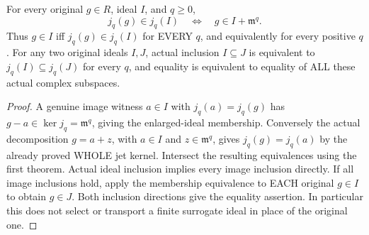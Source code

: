 \begin{theorem}
\label{hir:actual-whole-ideal-all-finite-jet-detection}
\leanok
For every original $g\in R$, ideal $I$, and $q\ge0$,
\[
 j_q(g)\in j_q(I)\quad\Longleftrightarrow\quad
 g\in I+\mathfrak m^q.
\]
Thus $g\in I$ iff $j_q(g)\in j_q(I)$ for EVERY $q$, and equivalently
for every positive $q$. For any two original ideals $I,J$, actual
inclusion $I\subseteq J$ is equivalent to $j_q(I)\subseteq j_q(J)$ for
every $q$, and equality is equivalent to equality of ALL these actual
complex subspaces.
\end{theorem}
\begin{proof}
A genuine image witness $a\in I$ with $j_q(a)=j_q(g)$ has
$g-a\in\ker j_q=\mathfrak m^q$, giving the enlarged-ideal membership.
Conversely the actual decomposition $g=a+z$, with $a\in I$ and
$z\in\mathfrak m^q$, gives $j_q(g)=j_q(a)$ by the already proved
WHOLE jet kernel. Intersect the resulting equivalences using the first
theorem. Actual ideal inclusion implies every image inclusion directly.
If all image inclusions hold, apply the membership equivalence to EACH
original $g\in I$ to obtain $g\in J$. Both inclusion directions give the
equality assertion. In particular this does not select or transport a
finite surrogate ideal in place of the original one.
\end{proof}

